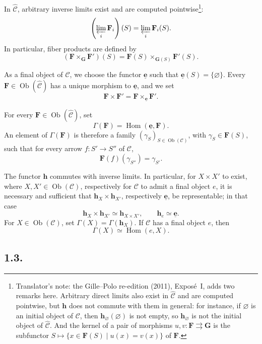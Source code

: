 In \(\widehat{\mathscr C}\), arbitrary inverse limits exist and are computed
pointwise\footnote{Translator's note: the Gille--Polo re-edition (2011), Exposé~I, adds two
remarks here. Arbitrary direct limits also exist in \(\widehat{\mathscr C}\)
and are computed pointwise, but \(\mathbf h\) does not commute with them in
general: for instance, if \(\varnothing\) is an initial object of
\(\mathscr C\), then \(\mathbf h_\varnothing(\varnothing)\) is not empty, so
\(\mathbf h_\varnothing\) is not the initial object of
\(\widehat{\mathscr C}\). And the kernel of a pair of morphisms
\(u,v:\mathbf F\rightrightarrows\mathbf G\) is the subfunctor
\(S\mapsto\{x\in\mathbf F(S)\mid u(x)=v(x)\}\) of \(\mathbf F\).}:
\[
  \left(\varprojlim_i\mathbf F_i\right)(S)
    =\varprojlim_i\mathbf F_i(S).
\]
In particular, fiber products are defined by
\[
  (\mathbf F\mathbin{\times_{\mathbf G}}\mathbf F')(S)
    =\mathbf F(S)\mathbin{\times_{\mathbf G(S)}}\mathbf F'(S).
\]

As a final object of \(\widehat{\mathscr C}\), we choose the functor
\(\underline{\mathbf e}\) such that
\(\underline{\mathbf e}(S)=\{\varnothing\}\).
Every \(\mathbf F\in\operatorname{Ob}(\widehat{\mathscr C})\) has a unique
morphism to \(\underline{\mathbf e}\), and we set
\[
  \mathbf F\times\mathbf F'
    =\mathbf F\mathbin{\times_{\underline{\mathbf e}}}\mathbf F'.
\]

For every \(\mathbf F\in\operatorname{Ob}(\widehat{\mathscr C})\), set
\[
  \Gamma(\mathbf F)=\operatorname{Hom}
    (\underline{\mathbf e},\mathbf F).
\]
An element of \(\Gamma(\mathbf F)\) is therefore a family
\((\gamma_S)_{S\in\operatorname{Ob}(\mathscr C)}\), with
\(\gamma_S\in\mathbf F(S)\), such that for every arrow
\(f:S'\to S''\) of \(\mathscr C\),
\[
  \mathbf F(f)(\gamma_{S''})=\gamma_{S'}.
\]

The functor \(\mathbf h\) commutes with inverse limits. In particular, for
\(X\times X'\) to exist, where
\(X,X'\in\operatorname{Ob}(\mathscr C)\), respectively for \(\mathscr C\) to
admit a final object \(e\), it is necessary and sufficient that
\(\mathbf h_X\times\mathbf h_{X'}\), respectively
\(\underline{\mathbf e}\), be representable; in that case
\[
  \mathbf h_X\times\mathbf h_{X'}\simeq\mathbf h_{X\times X'},
  \qquad
  \mathbf h_e\simeq\underline{\mathbf e}.
\]
For \(X\in\operatorname{Ob}(\mathscr C)\), set
\(\Gamma(X)=\Gamma(\mathbf h_X)\). If \(\mathscr C\) has a final object
\(e\), then
\[
  \Gamma(X)\simeq\operatorname{Hom}(e,X).
\]

\subsection*{1.3.}

